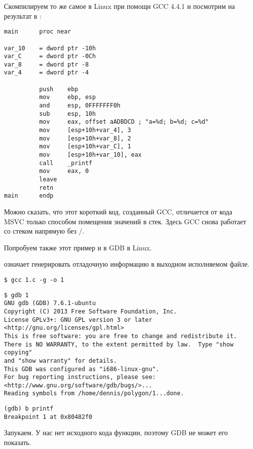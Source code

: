 
Скомпилируем то же самое в Linux при помощи GCC 4.4.1 и посмотрим на результат в \IDA:

\begin{lstlisting}
main      proc near

var_10    = dword ptr -10h
var_C     = dword ptr -0Ch
var_8     = dword ptr -8
var_4     = dword ptr -4

          push    ebp
          mov     ebp, esp
          and     esp, 0FFFFFFF0h
          sub     esp, 10h
          mov     eax, offset aADBDCD ; "a=%d; b=%d; c=%d"
          mov     [esp+10h+var_4], 3
          mov     [esp+10h+var_8], 2
          mov     [esp+10h+var_C], 1
          mov     [esp+10h+var_10], eax
          call    _printf
          mov     eax, 0
          leave
          retn
main      endp
\end{lstlisting}

Можно сказать, что этот короткий код, созданный GCC, отличается от кода MSVC только способом помещения 
значений в стек.
Здесь GCC снова работает со стеком напрямую без \PUSH/\POP.


Попробуем также этот пример и в \ac{GDB} в Linux.

 означает генерировать отладочную информацию в выходном исполняемом файле.

\begin{lstlisting}
$ gcc 1.c -g -o 1
\end{lstlisting}

\begin{lstlisting}
$ gdb 1
GNU gdb (GDB) 7.6.1-ubuntu
Copyright (C) 2013 Free Software Foundation, Inc.
License GPLv3+: GNU GPL version 3 or later <http://gnu.org/licenses/gpl.html>
This is free software: you are free to change and redistribute it.
There is NO WARRANTY, to the extent permitted by law.  Type "show copying"
and "show warranty" for details.
This GDB was configured as "i686-linux-gnu".
For bug reporting instructions, please see:
<http://www.gnu.org/software/gdb/bugs/>...
Reading symbols from /home/dennis/polygon/1...done.
\end{lstlisting}

\begin{lstlisting}[caption=установим точку останова на \printf]
(gdb) b printf
Breakpoint 1 at 0x80482f0
\end{lstlisting}

Запукаем.
У нас нет исходного кода функции, поэтому \ac{GDB} не может его показать.

